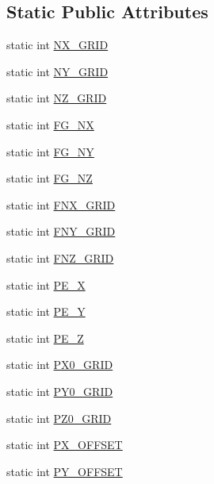 \subsection*{Static Public Attributes}
\begin{DoxyCompactItemize}
\item 
static int \hyperlink{class_base_grid_a7548700bafe00f4dc83c9aa9b210af9f}{N\-X\-\_\-\-G\-R\-I\-D}
\item 
static int \hyperlink{class_base_grid_a2cbc204f1d85502e73427a97d9def80e}{N\-Y\-\_\-\-G\-R\-I\-D}
\item 
static int \hyperlink{class_base_grid_aaffbb314d36e8a39b245570286b04683}{N\-Z\-\_\-\-G\-R\-I\-D}
\item 
static int \hyperlink{class_base_grid_ae2f8fc9fc2edbad1fbabf64d015bb47e}{F\-G\-\_\-\-N\-X}
\item 
static int \hyperlink{class_base_grid_a514a9d96f0e6705ddc362c3283104c00}{F\-G\-\_\-\-N\-Y}
\item 
static int \hyperlink{class_base_grid_a70dbc692098fece70703bb0113b33ca9}{F\-G\-\_\-\-N\-Z}
\item 
static int \hyperlink{class_base_grid_afcad549a8a66cead3bf1a4c343f5feee}{F\-N\-X\-\_\-\-G\-R\-I\-D}
\item 
static int \hyperlink{class_base_grid_ac9fe57335198675216c7bcefaa55f208}{F\-N\-Y\-\_\-\-G\-R\-I\-D}
\item 
static int \hyperlink{class_base_grid_ade692cabe6b6ad89bf8251ac01a6a1ce}{F\-N\-Z\-\_\-\-G\-R\-I\-D}
\item 
static int \hyperlink{class_base_grid_a360515bb70e6cb44d9d52040cd146b56}{P\-E\-\_\-\-X}
\item 
static int \hyperlink{class_base_grid_af598137aa30afd974f1113a3a287122e}{P\-E\-\_\-\-Y}
\item 
static int \hyperlink{class_base_grid_a54b187f8615fff7d8ed3ba2e58ffc95c}{P\-E\-\_\-\-Z}
\item 
static int \hyperlink{class_base_grid_a18092a6bcab1e1317cc226e8c52cb192}{P\-X0\-\_\-\-G\-R\-I\-D}
\item 
static int \hyperlink{class_base_grid_a9fc7098a0311bc920bef6751ae334970}{P\-Y0\-\_\-\-G\-R\-I\-D}
\item 
static int \hyperlink{class_base_grid_ae6982519f986a2308089e1f61becc723}{P\-Z0\-\_\-\-G\-R\-I\-D}
\item 
static int \hyperlink{class_base_grid_a15f7a44d0ab7093cb9de242cbc7dbdb8}{P\-X\-\_\-\-O\-F\-F\-S\-E\-T}
\item 
static int \hyperlink{class_base_grid_a547d038c7d6c99550ff53d6820f4e1c9}{P\-Y\-\_\-\-O\-F\-F\-S\-E\-T}

\end{DoxyCompactItemize}
